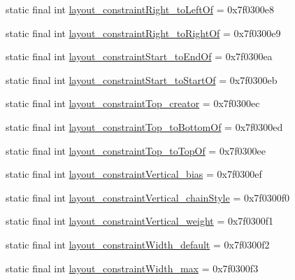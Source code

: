 \begin{DoxyCompactItemize}
\item 
static final int \mbox{\hyperlink{classandroid_1_1support_1_1constraint_1_1_r_1_1attr_a88390997b2c64ef38008e0a1209dd2a8}{layout\+\_\+constraint\+Right\+\_\+to\+Left\+Of}} = 0x7f0300e8
\item 
static final int \mbox{\hyperlink{classandroid_1_1support_1_1constraint_1_1_r_1_1attr_aa7ab6f21a7788d92e694b8ea78c13292}{layout\+\_\+constraint\+Right\+\_\+to\+Right\+Of}} = 0x7f0300e9
\item 
static final int \mbox{\hyperlink{classandroid_1_1support_1_1constraint_1_1_r_1_1attr_a55c621112454218578186b5e06f8d518}{layout\+\_\+constraint\+Start\+\_\+to\+End\+Of}} = 0x7f0300ea
\item 
static final int \mbox{\hyperlink{classandroid_1_1support_1_1constraint_1_1_r_1_1attr_a09d13bb5f21635090c1676172c18717d}{layout\+\_\+constraint\+Start\+\_\+to\+Start\+Of}} = 0x7f0300eb
\item 
static final int \mbox{\hyperlink{classandroid_1_1support_1_1constraint_1_1_r_1_1attr_a82397ac544fbbe04a557eb041e4689d8}{layout\+\_\+constraint\+Top\+\_\+creator}} = 0x7f0300ec
\item 
static final int \mbox{\hyperlink{classandroid_1_1support_1_1constraint_1_1_r_1_1attr_aec047b7f863db59890548c8f06e8da6e}{layout\+\_\+constraint\+Top\+\_\+to\+Bottom\+Of}} = 0x7f0300ed
\item 
static final int \mbox{\hyperlink{classandroid_1_1support_1_1constraint_1_1_r_1_1attr_a24f51dda33a94c484660e9b552114c0a}{layout\+\_\+constraint\+Top\+\_\+to\+Top\+Of}} = 0x7f0300ee
\item 
static final int \mbox{\hyperlink{classandroid_1_1support_1_1constraint_1_1_r_1_1attr_ad55991d4c0c3e4144a9a164b8d7b0322}{layout\+\_\+constraint\+Vertical\+\_\+bias}} = 0x7f0300ef
\item 
static final int \mbox{\hyperlink{classandroid_1_1support_1_1constraint_1_1_r_1_1attr_aa0e83db803c8fadca1a42781a35b0bcd}{layout\+\_\+constraint\+Vertical\+\_\+chain\+Style}} = 0x7f0300f0
\item 
static final int \mbox{\hyperlink{classandroid_1_1support_1_1constraint_1_1_r_1_1attr_a317bc77e34fd5974e0f690a3fb83d2a6}{layout\+\_\+constraint\+Vertical\+\_\+weight}} = 0x7f0300f1
\item 
static final int \mbox{\hyperlink{classandroid_1_1support_1_1constraint_1_1_r_1_1attr_a852ae278bd03fa843564100268dbb0ff}{layout\+\_\+constraint\+Width\+\_\+default}} = 0x7f0300f2
\item 
static final int \mbox{\hyperlink{classandroid_1_1support_1_1constraint_1_1_r_1_1attr_a8ff245be4c36f0690b7853d834fef594}{layout\+\_\+constraint\+Width\+\_\+max}} = 0x7f0300f3

\end{DoxyCompactItemize}
